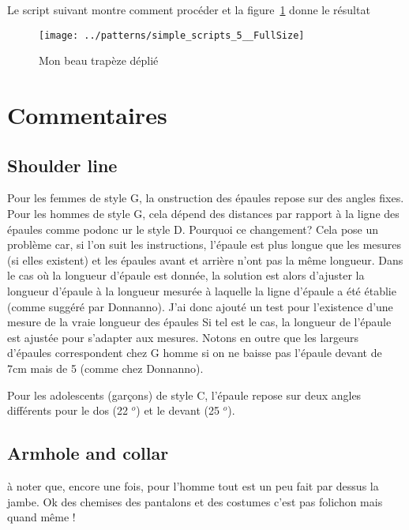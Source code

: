 \documentclass[10pt,a4paper,twoside]{report}
\begin{document}
Le script suivant montre comment procéder et la figure~\ref{fig:unfold} donne le résultat




\begin{figure}
\begin{center}
\texttt{[image: ../patterns/simple\_scripts\_5\_\_FullSize]}
\end{center}
\caption{Mon beau trapèze déplié}
\label{fig:unfold}
\end{figure}





\chapter{Commentaires}


\section{Shoulder line}

Pour les femmes de style G, la  onstruction des épaules repose sur des angles fixes. Pour les hommes de style G, cela dépend des distances par rapport à la ligne des épaules comme podonc ur le style D. Pourquoi ce changement? Cela pose un problème car, si l'on suit les instructions, l'épaule est plus longue que les mesures (si elles existent) et les épaules avant et arrière n'ont pas la même longueur. Dans le cas où la longueur d'épaule est donnée, la solution est alors d'ajuster la longueur d'épaule à la longueur mesurée à laquelle la ligne d'épaule a été établie (comme suggéré par Donnanno). J'ai donc ajouté un test pour l'existence d'une mesure de la vraie longueur des épaules Si tel est le cas, la longueur de l'épaule est ajustée pour s'adapter aux mesures. Notons en outre que les largeurs d'épaules correspondent chez G homme si on ne baisse pas l'épaule devant de 7cm mais de 5 (comme chez Donnanno).


Pour les adolescents (garçons) de style C, l'épaule repose sur deux angles différents pour le dos (22 $ ^ o $) et le devant (25 $ ^ o $).



\section{Armhole and collar}

à noter que, encore une fois, pour l'homme tout est un peu fait par dessus
la jambe. Ok des chemises des pantalons et des costumes c'est pas
folichon mais quand même !
\end{document}
